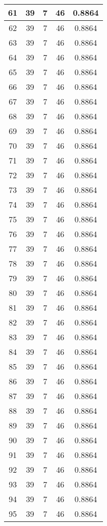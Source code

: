 \documentclass[letterpaper, 12pt]{article}
\begin{document}
\begin{longtable}{|c|c|c|c|c|}
61 & 39 & 7 & 46 & 0.8864 \\
\hline
62 & 39 & 7 & 46 & 0.8864 \\
\hline
63 & 39 & 7 & 46 & 0.8864 \\
\hline
64 & 39 & 7 & 46 & 0.8864 \\
\hline
65 & 39 & 7 & 46 & 0.8864 \\
\hline
66 & 39 & 7 & 46 & 0.8864 \\
\hline
67 & 39 & 7 & 46 & 0.8864 \\
\hline
68 & 39 & 7 & 46 & 0.8864 \\
\hline
69 & 39 & 7 & 46 & 0.8864 \\
\hline
70 & 39 & 7 & 46 & 0.8864 \\
\hline
71 & 39 & 7 & 46 & 0.8864 \\
\hline
72 & 39 & 7 & 46 & 0.8864 \\
\hline
73 & 39 & 7 & 46 & 0.8864 \\
\hline
74 & 39 & 7 & 46 & 0.8864 \\
\hline
75 & 39 & 7 & 46 & 0.8864 \\
\hline
76 & 39 & 7 & 46 & 0.8864 \\
\hline
77 & 39 & 7 & 46 & 0.8864 \\
\hline
78 & 39 & 7 & 46 & 0.8864 \\
\hline
79 & 39 & 7 & 46 & 0.8864 \\
\hline
80 & 39 & 7 & 46 & 0.8864 \\
\hline
81 & 39 & 7 & 46 & 0.8864 \\
\hline
82 & 39 & 7 & 46 & 0.8864 \\
\hline
83 & 39 & 7 & 46 & 0.8864 \\
\hline
84 & 39 & 7 & 46 & 0.8864 \\
\hline
85 & 39 & 7 & 46 & 0.8864 \\
\hline
86 & 39 & 7 & 46 & 0.8864 \\
\hline
87 & 39 & 7 & 46 & 0.8864 \\
\hline
88 & 39 & 7 & 46 & 0.8864 \\
\hline
89 & 39 & 7 & 46 & 0.8864 \\
\hline
90 & 39 & 7 & 46 & 0.8864 \\
\hline
91 & 39 & 7 & 46 & 0.8864 \\
\hline
92 & 39 & 7 & 46 & 0.8864 \\
\hline
93 & 39 & 7 & 46 & 0.8864 \\
\hline
94 & 39 & 7 & 46 & 0.8864 \\
\hline
95 & 39 & 7 & 46 & 0.8864 \\

\end{longtable}
\end{document}

